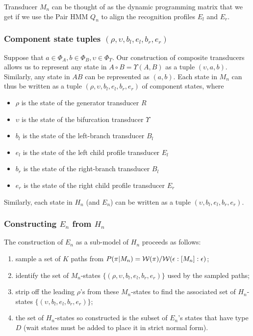 \documentclass{article}
\newcommand\wtrans[4]{#1(#2 : [#3] : #4)}
\newcommand\compose{}
\newcommand\fork{\circ}
\newcommand\idfork{\Upsilon}
\newcommand\forkn[1]{\idfork(#1)}
\newcommand\forkfun[2]{\forkn{#1, #2}}
\newcommand\States{\Phi}
\newcommand\statesof[1]{\States_{#1}}
\newcommand\weight{{\cal W}}
\newcommand\hstate{(\upsilon,b_l,e_l,b_r,e_r)}
\newcommand\mstate{(\rho,\upsilon,b_l,e_l,b_r,e_r)}
\begin{document}
Transducer $M_n$ can be thought of as the dynamic programming matrix that we get
if we use the Pair HMM $Q_n$ to align the recognition profiles $E_l$ and $E_r$.

\subsubsection{Component state tuples $\mstate$}
Suppose that $a \in \statesof{A}, b \in \statesof{B}, \upsilon \in \statesof{\idfork}$.
Our construction of composite transducers allows us to represent any state in $A \fork B = \forkfun{A}{B}$ as a tuple $(\upsilon, a,b)$.
Similarly, any state in $A \compose B$ can be represented as $(a,b)$.
Each state in $M_n$ can thus be written as a tuple $\mstate$ of component states, where
\begin{itemize}
\item $\rho$ is the state of the generator transducer $R$
\item $\upsilon$ is the state of the bifurcation transducer $\idfork$
\item $b_l$ is the state of the left-branch transducer $B_l$
\item $e_l$ is the state of the left child profile transducer $E_l$
\item $b_r$ is the state of the right-branch transducer $B_l$
\item $e_r$ is the state of the right child profile transducer $E_r$
\end{itemize}
Similarly, each state in $H_n$ (and $E_n$) can be written as a tuple $\hstate$.

\subsubsection{Constructing $E_n$ from $H_n$}
The construction of $E_n$ as a sub-model of $H_n$ proceeds as follows:
\begin{enumerate}
\item sample a set of $K$ paths from $P(\pi | M_n) = \weight(\pi) / \wtrans{\weight}{\epsilon}{M_n}{\epsilon}$;
\item identify the set of $M_n$-states $\{\mstate\}$ used by the sampled paths;
\item strip off the leading $\rho$'s from these $M_n$-states to find the associated set of $H_n$-states $\{\hstate\}$;
\item the set of $H_n$-states so constructed is the subset of $E_n$'s states that have type $D$ (wait states must be added to place it in strict normal form).
\end{enumerate}
\end{document}
